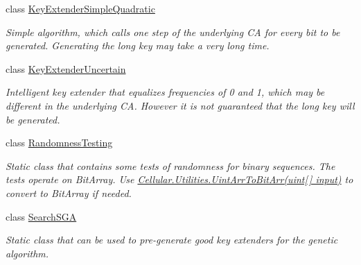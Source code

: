 \begin{DoxyCompactItemize}
class \hyperlink{class_crypto_1_1_key_extender_simple_quadratic}{Key\+Extender\+Simple\+Quadratic}
\begin{DoxyCompactList}\small\item\em Simple algorithm, which calls one step of the underlying C\+A for every bit to be generated. Generating the long key may take a very long time. \end{DoxyCompactList}\item 
class \hyperlink{class_crypto_1_1_key_extender_uncertain}{Key\+Extender\+Uncertain}
\begin{DoxyCompactList}\small\item\em Intelligent key extender that equalizes frequencies of 0 and 1, which may be different in the underlying C\+A. However it is not guaranteed that the long key will be generated. \end{DoxyCompactList}\item 
class \hyperlink{class_crypto_1_1_randomness_testing}{Randomness\+Testing}
\begin{DoxyCompactList}\small\item\em Static class that contains some tests of randomness for binary sequences. The tests operate on Bit\+Array. Use {\ttfamily \hyperlink{class_cellular_1_1_utilities_a3e6d6ebde1b445f03d3c0b1a9c0274e6}{Cellular.\+Utilities.\+Uint\+Arr\+To\+Bit\+Arr(uint\mbox{[}$\,$\mbox{]} input)}} to convert to Bit\+Array if needed. \end{DoxyCompactList}\item 
class \hyperlink{class_crypto_1_1_search_s_g_a}{Search\+S\+G\+A}
\begin{DoxyCompactList}\small\item\em Static class that can be used to pre-\/generate good key extenders for the genetic algorithm. \end{DoxyCompactList}\end{DoxyCompactItemize}
